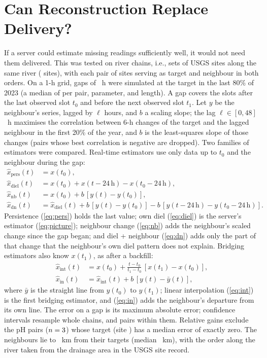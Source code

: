 \section{Can Reconstruction Replace Delivery?}
\label{sec:reconstruct}

If a server could estimate missing readings sufficiently well, it would not need them delivered. This was tested on \chainCountWord{} river chains, i.e., sets of USGS sites along the same river (\chainSites{} sites), with each pair of sites serving as target and neighbour in both orders. On a 1-h grid, gaps of \chainGaps~h were simulated at the target in the last 80\% of 2023 (a median of \chainOutages{} per pair, parameter, and length). A gap covers the slots after the last observed slot $t_0$ and before the next observed slot $t_1$. Let $y$ be the neighbour's series, lagged by $\ell$ hours, and $b$ a scaling slope; the lag $\ell\in[0,48]$~h maximises the correlation between 6-h changes of the target and the lagged neighbour in the first 20\% of the year, and $b$ is the least-squares slope of those changes (pairs whose best correlation is negative are dropped). Two families of estimators were compared. Real-time estimators use only data up to $t_0$ and the neighbour during the gap:
\begin{align}
\hat{x}_\mathrm{pers}(t)&=x(t_0), \label{eq:pers}\\
\hat{x}_\mathrm{diel}(t)&=x(t_0)+x(t-24\,\mathrm{h})-x(t_0-24\,\mathrm{h}), \label{eq:diel}\\
\hat{x}_\mathrm{nb}(t)&=x(t_0)+b\,[y(t)-y(t_0)], \label{eq:nb}\\
\hat{x}_\mathrm{dn}(t)&=\hat{x}_\mathrm{diel}(t)+b\,[y(t)-y(t_0)]-b\,[y(t-24\,\mathrm{h})-y(t_0-24\,\mathrm{h})]. \label{eq:dn}
\end{align}
Persistence (\ref{eq:pers}) holds the last value; own diel (\ref{eq:diel}) is the server's estimator (\ref{eq:picture}); neighbour change (\ref{eq:nb}) adds the neighbour's scaled change since the gap began; and diel + neighbour (\ref{eq:dn}) adds only the part of that change that the neighbour's own diel pattern does not explain. Bridging estimators also know $x(t_1)$, as after a backfill:
\begin{align}
\hat{x}_\mathrm{int}(t)&=x(t_0)+\frac{t-t_0}{t_1-t_0}\,[x(t_1)-x(t_0)], \label{eq:int}\\
\hat{x}_\mathrm{in}(t)&=\hat{x}_\mathrm{int}(t)+b\,[y(t)-\bar{y}(t)], \label{eq:in}
\end{align}
where $\bar{y}$ is the straight line from $y(t_0)$ to $y(t_1)$; linear interpolation (\ref{eq:int}) is the first bridging estimator, and (\ref{eq:in}) adds the neighbour's departure from its own line. The error on a gap is its maximum absolute error; confidence intervals resample whole chains, and pairs within them. Relative gains exclude the pH pairs ($n=3$) whose target (site \chainExclSite) has a median error of exactly zero. The neighbours lie \pairKmMin{} to \pairKmMax~km from their targets (median \pairKmMed~km), with the order along the river taken from the drainage area in the USGS site record.

